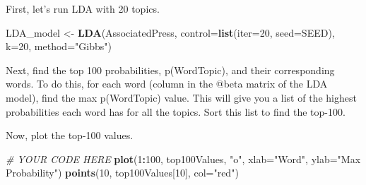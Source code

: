 \documentclass[]{article}
\newenvironment{Shaded}{\begin{snugshade}}{\end{snugshade}}
\newcommand{\CommentTok}[1]{\textcolor[rgb]{0.56,0.35,0.01}{\textit{#1}}}
\newcommand{\DataTypeTok}[1]{\textcolor[rgb]{0.13,0.29,0.53}{#1}}
\newcommand{\DecValTok}[1]{\textcolor[rgb]{0.00,0.00,0.81}{#1}}
\newcommand{\KeywordTok}[1]{\textcolor[rgb]{0.13,0.29,0.53}{\textbf{#1}}}
\newcommand{\NormalTok}[1]{#1}
\newcommand{\OperatorTok}[1]{\textcolor[rgb]{0.81,0.36,0.00}{\textbf{#1}}}
\newcommand{\StringTok}[1]{\textcolor[rgb]{0.31,0.60,0.02}{#1}}
\begin{document}
First, let's run LDA with 20 topics.

\begin{Shaded}
\begin{Highlighting}[]
\NormalTok{LDA_model <-}\StringTok{ }\KeywordTok{LDA}\NormalTok{(AssociatedPress, }\DataTypeTok{control=}\KeywordTok{list}\NormalTok{(}\DataTypeTok{iter=}\DecValTok{20}\NormalTok{, }\DataTypeTok{seed=}\NormalTok{SEED), }\DataTypeTok{k=}\DecValTok{20}\NormalTok{, }\DataTypeTok{method=}\StringTok{"Gibbs"}\NormalTok{)}
\end{Highlighting}
\end{Shaded}

Next, find the top 100 probabilities, p(Word\textbar{}Topic), and their
corresponding words. To do this, for each word (column in the @beta
matrix of the LDA model), find the max p(Word\textbar{}Topic) value.
This will give you a list of the highest probabilities each word has for
all the topics. Sort this list to find the top-100.

\begin{Shaded}
\end{Shaded}

Now, plot the top-100 values.

\begin{Shaded}
\begin{Highlighting}[]
\CommentTok{# YOUR CODE HERE}
\KeywordTok{plot}\NormalTok{(}\DecValTok{1}\OperatorTok{:}\DecValTok{100}\NormalTok{, top100Values, }\StringTok{"o"}\NormalTok{, }\DataTypeTok{xlab=}\StringTok{"Word"}\NormalTok{, }\DataTypeTok{ylab=}\StringTok{"Max Probability"}\NormalTok{)}
\KeywordTok{points}\NormalTok{(}\DecValTok{10}\NormalTok{, top100Values[}\DecValTok{10}\NormalTok{], }\DataTypeTok{col=}\StringTok{"red"}\NormalTok{)}
\end{Highlighting}
\end{Shaded}
\end{document}
